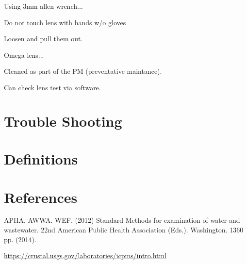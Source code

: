 \documentclass[12pt]{../SOP4_alpha}\usepackage[]{graphicx}\usepackage[]{color}
\begin{document}
\NP Using 3mm allen wrench...

\NP Do not touch lens with hands w/o gloves

\NP Loosen and pull them out.

\NP Omega lens...

\NP Cleaned as part of the PM (preventative maintance).

\NP Can check lens test via software.

\section{Trouble Shooting}

\section{Definitions} \label{Definitions}

\section{References}

\NP APHA, AWWA. WEF. (2012) Standard Methods for examination of water and wastewater. 22nd American Public Health Association (Eds.). Washington. 1360 pp. (2014).

\url{https://crustal.usgs.gov/laboratories/icpms/intro.html}
\end{document}
